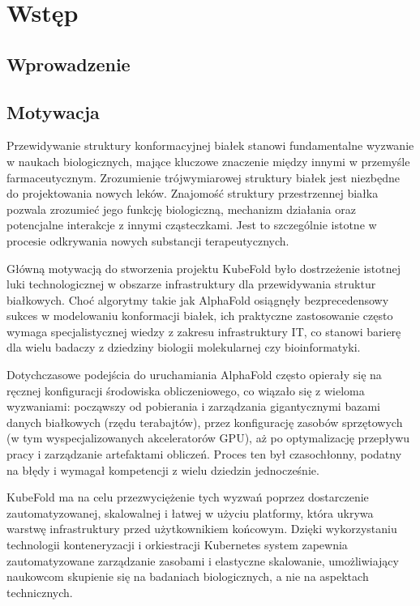 \chapter{Wstęp}


\section{Wprowadzenie}


\section{Motywacja}

Przewidywanie struktury konformacyjnej białek stanowi fundamentalne wyzwanie w naukach biologicznych, mające kluczowe znaczenie między innymi w przemyśle farmaceutycznym.
Zrozumienie trójwymiarowej struktury białek jest niezbędne do projektowania nowych leków.
Znajomość struktury przestrzennej białka pozwala zrozumieć jego funkcję biologiczną, mechanizm działania oraz potencjalne interakcje z innymi cząsteczkami.
Jest to szczególnie istotne w procesie odkrywania nowych substancji terapeutycznych.

Główną motywacją do stworzenia projektu KubeFold było dostrzeżenie istotnej luki technologicznej w obszarze infrastruktury dla przewidywania struktur białkowych.
Choć algorytmy takie jak AlphaFold \cite{alphafold3} osiągnęły bezprecedensowy sukces w modelowaniu konformacji białek, ich praktyczne zastosowanie często wymaga specjalistycznej wiedzy z zakresu infrastruktury IT, co stanowi barierę dla wielu badaczy z dziedziny biologii molekularnej czy bioinformatyki.

Dotychczasowe podejścia do uruchamiania AlphaFold często opierały się na ręcznej konfiguracji środowiska obliczeniowego, co wiązało się z wieloma wyzwaniami: począwszy od pobierania i zarządzania gigantycznymi bazami danych białkowych (rzędu terabajtów), przez konfigurację zasobów sprzętowych (w tym wyspecjalizowanych akceleratorów GPU), aż po optymalizację przepływu pracy i zarządzanie artefaktami obliczeń.
Proces ten był czasochłonny, podatny na błędy i wymagał kompetencji z wielu dziedzin jednocześnie.

KubeFold ma na celu przezwyciężenie tych wyzwań poprzez dostarczenie zautomatyzowanej, skalowalnej i łatwej w użyciu platformy, która ukrywa warstwę infrastruktury przed użytkownikiem końcowym.
Dzięki wykorzystaniu technologii konteneryzacji i orkiestracji Kubernetes \cite{kubernetes, container_orchestration} system zapewnia zautomatyzowane zarządzanie zasobami i elastyczne skalowanie, umożliwiający naukowcom skupienie się na badaniach biologicznych, a nie na aspektach technicznych.


